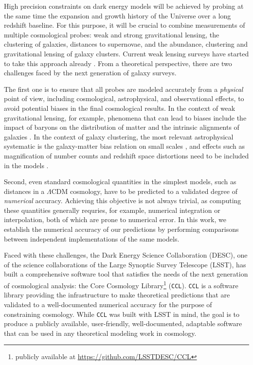 \documentclass[\docopts]{\docclass}
\newcommand{\ccl}{{\tt CCL}\xspace}
\begin{document}
High precision constraints on dark energy models will be achieved by probing at the same time the expansion and growth history of the Universe over a long redshift baseline. For this purpose, it will be crucial to combine measurements of multiple cosmological probes: weak and strong gravitational lensing, the clustering of galaxies, distances to supernovae, and the abundance, clustering and gravitational lensing of galaxy clusters. Current weak lensing surveys have started to take this approach already \citep{Joudaki18,vanUitert18,DEScombined,krause17}. From a theoretical perspective, there are two challenges faced by the next generation of galaxy surveys. 

The first one is to ensure that all probes are modeled accurately from a {\it physical} point of view, including cosmological, astrophysical, and observational effects, to avoid potential biases in the final cosmological results. In the context of weak gravitational lensing, for example, phenomena that can lead to biases include the impact of baryons on the distribution of matter and the intrinsic alignments of galaxies \citep[e.g.][]{vanDaalen11,Semboloni11,Troxel14,Krause15,Blazek17}. In the context of galaxy clustering, the most relevant astrophysical systematic is the galaxy-matter bias relation on small scales \citep{2013MNRAS.436.2038Z,2016arXiv161109787D}, and effects such as magnification of number counts and redshift space distortions need to be included in the models \citep{Alonso15,ghosh18}. 

Second, even standard cosmological quantities in the simplest models, such as distances in a $\Lambda$CDM cosmology, have to be predicted to a validated degree of {\it numerical} accuracy. Achieving this objective is not always trivial, as computing these quantities generally requries, for example, numerical integration or interpolation, both of which are prone to numerical error. In this work, we establish the numerical accuracy of our predictions by performing comparisons between independent implementations of the same models. 

Faced with these challenges, the Dark Energy Science Collaboration (DESC), one of the science collaborations of the Large Synoptic Survey Telescope (LSST), has built a comprehensive software tool that satisfies the needs of the next generation of cosmological analysis: the Core Cosmology Library\footnote{publicly available at \url{https://github.com/LSSTDESC/CCL}} (\ccl). \ccl is a software library providing the infrastructure to make theoretical predictions that are validated to a well-documented numerical accuracy for the purpose of constraining cosmology. While \ccl was built with LSST in mind, the goal is to produce a publicly available, user-friendly, well-documented, adaptable software that can be used in any theoretical modeling work in cosmology. 
\end{document}

